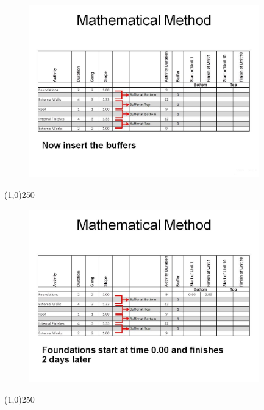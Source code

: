 \begin{frame}
\begin{figure}
	\centering
		\includegraphics[width = 10.0cm]{oldnotes/Slide281.jpg}
\end{figure}
\end{frame}
\begin{center}\line(1,0){250}\end{center}






\begin{frame}
\begin{figure}
	\centering
		\includegraphics[width = 10.0cm]{oldnotes/Slide282.jpg}
\end{figure}
\end{frame}
\begin{center}\line(1,0){250}\end{center}






